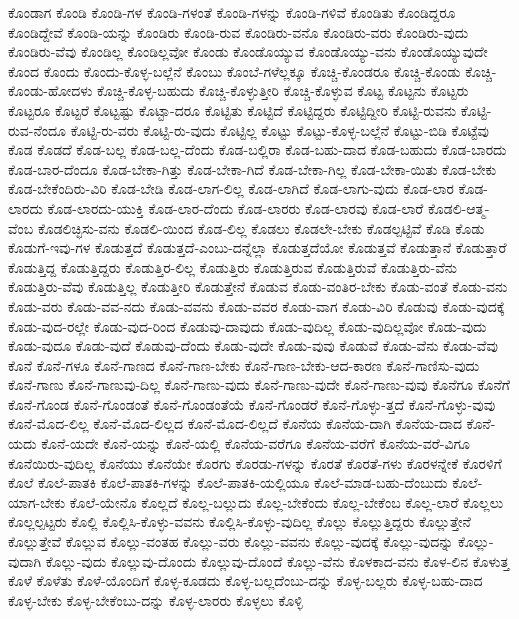 {ಕೊಂಡಾಗ
ಕೊಂಡಿ
ಕೊಂಡಿ-ಗಳ
ಕೊಂಡಿ-ಗಳಂತೆ
ಕೊಂಡಿ-ಗಳನ್ನು
ಕೊಂಡಿ-ಗಳಿವೆ
ಕೊಂಡಿತು
ಕೊಂಡಿದ್ದರೂ
ಕೊಂಡಿದ್ದೇವೆ
ಕೊಂಡಿ-ಯನ್ನು
ಕೊಂಡಿರು
ಕೊಂಡಿ-ರುವ
ಕೊಂಡಿರು-ವನೊ
ಕೊಂಡಿರು-ವರು
ಕೊಂಡಿರು-ವುದು
ಕೊಂಡಿರು-ವೆವು
ಕೊಂಡಿಲ್ಲ
ಕೊಂಡಿಲ್ಲವೋ
ಕೊಂಡು
ಕೊಂಡೊಯ್ಯುವ
ಕೊಂಡೊಯ್ಯು-ವನು
ಕೊಂಡೊಯ್ಯುವುದೇ
ಕೊಂದ
ಕೊಂದು
ಕೊಂದು-ಕೊಳ್ಳ-ಬಲ್ಲೆನೆ
ಕೊಂಬು
ಕೊಂಬೆ-ಗಳೆಲ್ಲಕ್ಕೂ
ಕೊಚ್ಚಿ-ಕೊಂಡರೂ
ಕೊಚ್ಚಿ-ಕೊಂಡು
ಕೊಚ್ಚಿ-ಕೊಂಡು-ಹೋದಳು
ಕೊಚ್ಚಿ-ಕೊಳ್ಳ-ಬಹುದು
ಕೊಚ್ಚಿ-ಕೊಳ್ಳುತ್ತೀರಿ
ಕೊಚ್ಚಿ-ಕೊಳ್ಳುವ
ಕೊಟ್ಟ
ಕೊಟ್ಟನು
ಕೊಟ್ಟರು
ಕೊಟ್ಟರೂ
ಕೊಟ್ಟರೆ
ಕೊಟ್ಟಷ್ಟು
ಕೊಟ್ಟಾ-ದರೂ
ಕೊಟ್ಟಿತು
ಕೊಟ್ಟಿದೆ
ಕೊಟ್ಟಿದ್ದರು
ಕೊಟ್ಟಿದ್ದೀರಿ
ಕೊಟ್ಟಿ-ರುವನು
ಕೊಟ್ಟಿ-ರುವ-ನೆಂದೂ
ಕೊಟ್ಟಿ-ರು-ವರು
ಕೊಟ್ಟಿ-ರು-ವುದು
ಕೊಟ್ಟಿಲ್ಲ
ಕೊಟ್ಟು
ಕೊಟ್ಟು-ಕೊಳ್ಳ-ಬಲ್ಲೆನೆ
ಕೊಟ್ಟು-ಬಿಡಿ
ಕೊಟ್ಟೆವು
ಕೊಡ
ಕೊಡದೆ
ಕೊಡ-ಬಲ್ಲ
ಕೊಡ-ಬಲ್ಲ-ದೆಂದು
ಕೊಡ-ಬಲ್ಲಿರಾ
ಕೊಡ-ಬಹು-ದಾದ
ಕೊಡ-ಬಹುದು
ಕೊಡ-ಬಾರದು
ಕೊಡ-ಬಾರ-ದೆಂದೂ
ಕೊಡ-ಬೇಕಾ-ಗಿತ್ತು
ಕೊಡ-ಬೇಕಾ-ಗಿದೆ
ಕೊಡ-ಬೇಕಾ-ಗಿಲ್ಲ
ಕೊಡ-ಬೇಕಾ-ಯಿತು
ಕೊಡ-ಬೇಕು
ಕೊಡ-ಬೇಕೆಂದಿರು-ವಿರಿ
ಕೊಡ-ಬೇಡಿ
ಕೊಡ-ಲಾಗ-ಲಿಲ್ಲ
ಕೊಡ-ಲಾಗಿದೆ
ಕೊಡ-ಲಾಗು-ವುದು
ಕೊಡ-ಲಾರ
ಕೊಡ-ಲಾರದು
ಕೊಡ-ಲಾರದು-ಯುಕ್ತಿ
ಕೊಡ-ಲಾರ-ದೆಂದು
ಕೊಡ-ಲಾರರು
ಕೊಡ-ಲಾರವು
ಕೊಡ-ಲಾರೆ
ಕೊಡಲಿ-ಆತ್ಮ-ವೆಂಬ
ಕೊಡಲಿಚ್ಛಿಸು-ವನು
ಕೊಡಲಿ-ಯಿಂದ
ಕೊಡ-ಲಿಲ್ಲ
ಕೊಡಲು
ಕೊಡಲೇ-ಬೇಕು
ಕೊಡಲ್ಪಟ್ಟಿವೆ
ಕೊಡಿ
ಕೊಡು
ಕೊಡುಗೆ-ಇವು-ಗಳ
ಕೊಡುತ್ತದೆ
ಕೊಡುತ್ತದೆ-ಎಂಬು-ದನ್ನೆಲ್ಲಾ
ಕೊಡುತ್ತದೆಯೋ
ಕೊಡುತ್ತವೆ
ಕೊಡುತ್ತಾನೆ
ಕೊಡುತ್ತಾರೆ
ಕೊಡುತ್ತಿದ್ದ
ಕೊಡುತ್ತಿದ್ದರು
ಕೊಡುತ್ತಿರ-ಲಿಲ್ಲ
ಕೊಡುತ್ತಿರು
ಕೊಡುತ್ತಿರುವ
ಕೊಡುತ್ತಿರುವೆ
ಕೊಡುತ್ತಿರು-ವೆನು
ಕೊಡುತ್ತಿರು-ವೆವು
ಕೊಡುತ್ತಿಲ್ಲ
ಕೊಡುತ್ತೀರಿ
ಕೊಡುತ್ತೇನೆ
ಕೊಡುವ
ಕೊಡು-ವಂತಿರ-ಬೇಕು
ಕೊಡು-ವಂತೆ
ಕೊಡು-ವನು
ಕೊಡು-ವರು
ಕೊಡು-ವವ-ನದು
ಕೊಡು-ವವನು
ಕೊಡು-ವವರ
ಕೊಡು-ವಾಗ
ಕೊಡು-ವಿರಿ
ಕೊಡುವು
ಕೊಡು-ವುದಕ್ಕೆ
ಕೊಡು-ವುದ-ರಲ್ಲೇ
ಕೊಡು-ವುದ-ರಿಂದ
ಕೊಡುವು-ದಾವುದು
ಕೊಡು-ವುದಿಲ್ಲ
ಕೊಡು-ವುದಿಲ್ಲವೋ
ಕೊಡು-ವುದು
ಕೊಡು-ವುದೂ
ಕೊಡು-ವುದೆ
ಕೊಡುವು-ದೆಂದು
ಕೊಡು-ವುದೇ
ಕೊಡು-ವುವು
ಕೊಡುವೆ
ಕೊಡು-ವೆನು
ಕೊಡು-ವೆವು
ಕೊನೆ
ಕೊನೆ-ಗಳೂ
ಕೊನೆ-ಗಾಣದ
ಕೊನೆ-ಗಾಣ-ಬೇಕು
ಕೊನೆ-ಗಾಣ-ಬೇಕು-ಆದ-ಕಾರಣ
ಕೊನೆ-ಗಾಣಿಸು-ವುದು
ಕೊನೆ-ಗಾಣು
ಕೊನೆ-ಗಾಣುವು-ದಿಲ್ಲ
ಕೊನೆ-ಗಾಣು-ವುದು
ಕೊನೆ-ಗಾಣು-ವುದೇ
ಕೊನೆ-ಗಾಣು-ವುವು
ಕೊನೆಗೂ
ಕೊನೆಗೆ
ಕೊನೆ-ಗೊಂಡ
ಕೊನೆ-ಗೊಂಡಂತೆ
ಕೊನೆ-ಗೊಂಡಂತೆಯೆ
ಕೊನೆ-ಗೊಂಡರೆ
ಕೊನೆ-ಗೊಳ್ಳು-ತ್ತದೆ
ಕೊನೆ-ಗೊಳ್ಳು-ವುವು
ಕೊನೆ-ಮೊದ-ಲಿಲ್ಲ
ಕೊನೆ-ಮೊದ-ಲಿಲ್ಲದ
ಕೊನೆ-ಮೊದ-ಲಿಲ್ಲದೆ
ಕೊನೆಯ
ಕೊನೆಯ-ದಾಗಿ
ಕೊನೆಯ-ದಾದ
ಕೊನೆ-ಯದು
ಕೊನೆ-ಯದೇ
ಕೊನೆ-ಯನ್ನು
ಕೊನೆ-ಯಲ್ಲಿ
ಕೊನೆಯ-ವರೆಗೂ
ಕೊನೆಯ-ವರೆಗೆ
ಕೊನೆಯ-ವರೆ-ವಿಗೂ
ಕೊನೆಯಿರು-ವುದಿಲ್ಲ
ಕೊನೆಯು
ಕೊನೆಯೇ
ಕೊರಗು
ಕೊರಡು-ಗಳನ್ನು
ಕೊರತೆ
ಕೊರತೆ-ಗಳು
ಕೊರಳನ್ನೇಕೆ
ಕೊರಳಿಗೆ
ಕೊಲೆ
ಕೊಲೆ-ಪಾತಕಿ
ಕೊಲೆ-ಪಾತಕಿ-ಗಳನ್ನು
ಕೊಲೆ-ಪಾತಕಿ-ಯಲ್ಲಿಯೂ
ಕೊಲೆ-ಮಾಡ-ಬಹು-ದೆಂಬುದು
ಕೊಲೆ-ಯಾಗ-ಬೇಕು
ಕೊಲೆ-ಯೇನೊ
ಕೊಲ್ಲದೆ
ಕೊಲ್ಲ-ಬಲ್ಲುದು
ಕೊಲ್ಲ-ಬೇಕೆಂದು
ಕೊಲ್ಲ-ಬೇಕೆಂಬ
ಕೊಲ್ಲ-ಲಾರೆ
ಕೊಲ್ಲಲು
ಕೊಲ್ಲಲ್ಪಟ್ಟರು
ಕೊಲ್ಲಿ
ಕೊಲ್ಲಿಸಿ-ಕೊಳ್ಳು-ವವನು
ಕೊಲ್ಲಿಸಿ-ಕೊಳ್ಳು-ವುದಿಲ್ಲ
ಕೊಲ್ಲು
ಕೊಲ್ಲುತ್ತಿದ್ದರು
ಕೊಲ್ಲುತ್ತೇನೆ
ಕೊಲ್ಲುತ್ತೇವೆ
ಕೊಲ್ಲುವ
ಕೊಲ್ಲು-ವಂತಹ
ಕೊಲ್ಲು-ವರು
ಕೊಲ್ಲು-ವವನು
ಕೊಲ್ಲು-ವುದಕ್ಕೆ
ಕೊಲ್ಲು-ವುದನ್ನು
ಕೊಲ್ಲು-ವುದಾಗಿ
ಕೊಲ್ಲು-ವುದು
ಕೊಲ್ಲುವು-ದೊಂದು
ಕೊಲ್ಲುವು-ದೊಂದೆ
ಕೊಲ್ಲು-ವೆನು
ಕೊಳಕಾದ-ವನು
ಕೊಳ-ಲಿನ
ಕೊಳುತ್ತ
ಕೊಳೆ
ಕೊಳೆತು
ಕೊಳೆ-ಯೊಂದಿಗೆ
ಕೊಳ್ಳ-ಕೂಡದು
ಕೊಳ್ಳ-ಬಲ್ಲದೆಂಬು-ದನ್ನು
ಕೊಳ್ಳ-ಬಲ್ಲರು
ಕೊಳ್ಳ-ಬಹು-ದಾದ
ಕೊಳ್ಳ-ಬೇಕು
ಕೊಳ್ಳ-ಬೇಕೆಂಬು-ದನ್ನು
ಕೊಳ್ಳ-ಲಾರರು
ಕೊಳ್ಳಲು
ಕೊಳ್ಳಿ
}
